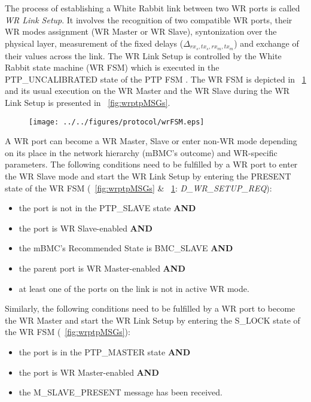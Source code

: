 The process of establishing a White Rabbit link between two WR ports
is called \textit{WR Link Setup}. It involves the
recognition of two compatible WR ports, their WR modes assignment
(WR Master or WR Slave), syntonization over the physical layer, 
measurement of the fixed delays ($\Delta_{rx_s,tx_s,rx_m,tx_m}$) and 
exchange of their values across the link. The WR Link Setup is controlled by the
White Rabbit state machine (WR FSM) which is executed in the PTP\_UNCALIBRATED 
state of the PTP FSM . 
The WR FSM is depicted in \figurename~\ref{fig:wrFSM} and 
its usual execution on the WR Master and the WR Slave during the WR Link Setup is
presented in \figurename~\ref{fig:wrptpMSGs}.
\begin{figure}[!t]
\centering
\texttt{[image: ../../figures/protocol/wrFSM.eps]}
\caption{}
\label{fig:wrFSM}
\end{figure}

A WR port can become a WR Master, Slave or enter non-WR mode depending on its 
place in the network hierarchy (mBMC's outcome) and WR-specific parameters. 
The following conditions need to be fulfilled by a WR port 
to enter the WR Slave mode and start the WR Link Setup by entering the PRESENT state of the WR FSM
(\figurename~\ref{fig:wrptpMSGs} \& \figurename~\ref{fig:wrFSM}: \textit{D\_WR\_SETUP\_REQ}):
\begin{itemize}
\item the port is not in the PTP\_SLAVE state \textbf{AND}
\item the port is WR Slave-enabled \textbf{AND}
\item the mBMC's Recommended State is BMC\_SLAVE \textbf{AND}
\item the parent port is WR Master-enabled \textbf{AND}
\item at least one of the ports on the link is not in active WR mode.
\end{itemize}
Similarly, the following conditions need to be fulfilled by a WR port 
to become the WR Master and start the WR Link Setup by entering the S\_LOCK state of the WR FSM
(\figurename~\ref{fig:wrptpMSGs}):
\begin{itemize}
\item the port is in the PTP\_MASTER state \textbf{AND}
\item the port is WR Master-enabled \textbf{AND}
\item the M\_SLAVE\_PRESENT message has been received.
\end{itemize}

